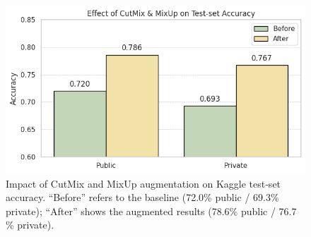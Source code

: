 \begin{figure}[h!]
  \centering
  \includegraphics[width=\columnwidth]{figures/augmentation_result}
  \caption{Impact of CutMix and MixUp augmentation on Kaggle test‐set accuracy. “Before” refers to the baseline (72.0\% public / 69.3\% private); “After” shows the augmented results (78.6\% public / 76.7 \% private).}
  \label{fig:augmentation_result}
\end{figure}